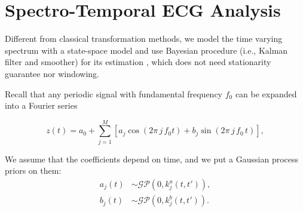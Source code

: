 \documentclass[portrait,a0,final]{a0poster} %
\newcommand{\sectionspace}{10mm} %
\begin{document}
\begin{minipage}{0.98\linewidth}
\begin{minipage}[t]{0.47\linewidth}
\vspace{\sectionspace}
\section*{Spectro-Temporal ECG Analysis}

Different from classical transformation methods, we model the time varying spectrum with a state-space model and use Bayesian procedure (i.e., Kalman filter and smoother) for its estimation \cite{qi2002bayesian}, which does not need stationarity guarantee nor windowing. 

Recall that any periodic signal with fundamental frequency $f_0$ can be expanded into a Fourier series

\begin{equation}
z(t) = a_0 + \sum_{j=1}^{M} \left[ a_{j} \cos(2\pi \, j \, f_0 t) + b_{j} \sin(2\pi  \, j \, f_0 \, t) \right],
\label{equ:fourier_series}
\end{equation}

We assume that the coefficients depend on time, and we put a Gaussian process priors on them:
%
\begin{equation}
\begin{split}
a_j(t) &\sim \mathcal{GP}(0,k^a_j(t,t')), \\
b_j(t) &\sim \mathcal{GP}(0,k^b_j(t,t')).
\end{split}
\end{equation}


\end{minipage}
\end{minipage}
\end{document}
